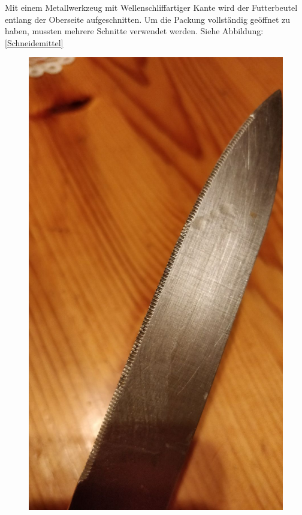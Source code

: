 Mit einem Metallwerkzeug mit Wellenschliffartiger Kante wird der Futterbeutel entlang der Oberseite aufgeschnitten. Um die Packung vollständig geöffnet zu haben, mussten mehrere Schnitte verwendet werden. Siehe Abbildung: \ref{Schneidemittel}

\begin{figure}[H]
   \begin{minipage}[hbt]{.3\linewidth} %
      \includegraphics[width=\linewidth]{Bilder/Schneideversuch_2.Art/Schneidemittel}

\end{minipage}
\end{figure}
